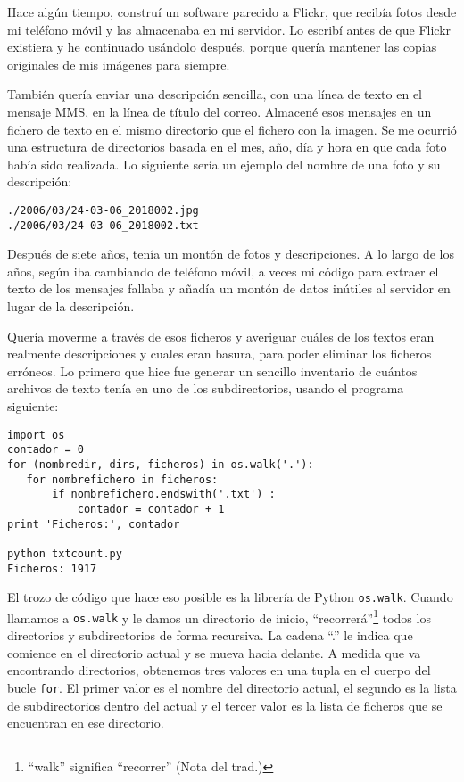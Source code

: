 Hace algún tiempo, construí un software parecido a Flickr, que
recibía fotos desde mi teléfono móvil y las almacenaba
en mi servidor. Lo escribí antes de que Flickr existiera y he continuado
usándolo después, porque quería mantener las copias originales
de mis imágenes para siempre.

También quería enviar una descripción sencilla, con una línea de texto en el mensaje MMS,
en la línea de título del correo. Almacené esos mensajes
en un fichero de texto en el mismo directorio que el fichero con la imagen.
Se me ocurrió una estructura de directorios basada en el mes, año, día y hora en
que cada foto había sido realizada. Lo siguiente sería un ejemplo del nombre
de una foto y su descripción:

\beforeverb
\begin{verbatim}
./2006/03/24-03-06_2018002.jpg
./2006/03/24-03-06_2018002.txt
\end{verbatim}
\afterverb
%
Después de siete años, tenía un montón de fotos y descripciones. A lo largo de los años,
según iba cambiando de teléfono móvil, a veces mi código para extraer el texto de los mensajes
fallaba y añadía un montón de datos inútiles al servidor en lugar de la descripción.

Quería moverme a través de esos ficheros y averiguar cuáles de los
textos eran realmente descripciones y cuales eran basura, para poder eliminar
los ficheros erróneos. Lo primero que hice fue generar un sencillo inventario de
cuántos archivos de texto tenía en uno de los subdirectorios,
usando el programa siguiente:

\beforeverb
\begin{verbatim}
import os
contador = 0
for (nombredir, dirs, ficheros) in os.walk('.'):
   for nombrefichero in ficheros:
       if nombrefichero.endswith('.txt') :
           contador = contador + 1
print 'Ficheros:', contador

python txtcount.py
Ficheros: 1917
\end{verbatim}
\afterverb
%
El trozo de código que hace eso posible es la librería de Python
{\tt os.walk}. Cuando llamamos a {\tt os.walk} y le damos un directorio
de inicio, ``recorrerá''\footnote{``walk'' significa ``recorrer'' (Nota del trad.)}
todos los directorios y subdirectorios de forma recursiva. La cadena ``.'' le indica
que comience en el directorio actual y se mueva hacia delante.
A medida que va encontrando directorios, obtenemos tres valores en una tupla
en el cuerpo del bucle {\tt for}. El primer valor es el nombre del
directorio actual, el segundo es la lista de subdirectorios dentro
del actual y el tercer valor es la lista de ficheros
que se encuentran en ese directorio.

